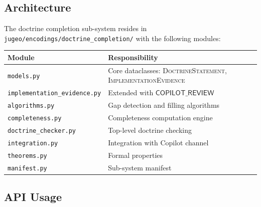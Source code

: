 \documentclass[11pt]{article}
\newcommand{\DocStmt}{\textsc{DoctrineStatement}}
\newcommand{\ImpEvid}{\textsc{ImplementationEvidence}}
\newcommand{\EvKind}{\mathsf{EvidenceKind}}
\newcommand{\CopRev}{\mathsf{COPILOT\_REVIEW}}
\begin{document}
\subsection{Architecture}

The doctrine completion sub-system resides in
\texttt{jugeo/encodings/doctrine\_completion/} with the following modules:

\begin{center}
\begin{tabular}{ll}
\toprule
\textbf{Module} & \textbf{Responsibility} \\
\midrule
\texttt{models.py}                   & Core dataclasses: \DocStmt, \ImpEvid \\
\texttt{implementation\_evidence.py} & Extended \EvKind{} with $\CopRev$ \\
\texttt{algorithms.py}               & Gap detection and filling algorithms \\
\texttt{completeness.py}             & Completeness computation engine \\
\texttt{doctrine\_checker.py}        & Top-level doctrine checking \\
\texttt{integration.py}              & Integration with Copilot channel \\
\texttt{theorems.py}                 & Formal properties \\
\texttt{manifest.py}                 & Sub-system manifest \\
\bottomrule
\end{tabular}
\end{center}

\subsection{API Usage}
\end{document}
